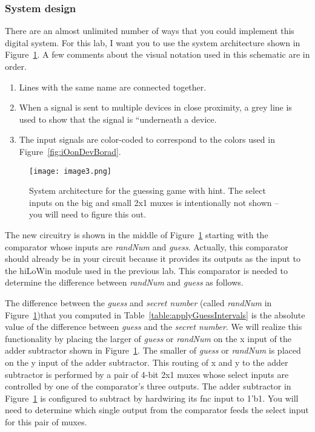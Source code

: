\subsubsection{System design}

There are an almost unlimited number of ways that you could implement
this digital system. For this lab, I want you to use the system
architecture shown in Figure~\ref{fig:guessWithHintSystemArch}. A few comments about the visual notation
used in this schematic are in order.

\begin{enumerate}
\def\labelenumi{\arabic{enumi})}
\item
  Lines with the same name are connected together.
\item
  When a signal is sent to multiple devices in close proximity, a grey
  line is used to show that the signal is ``underneath a device.
\item
  The input signals are color-coded to correspond to the colors used in
  Figure~\ref{fig:iOonDevBorad}.
\end{enumerate}

\begin{figure}
\texttt{[image:  image3.png]}
\caption{System architecture for the guessing game with hint. The select
inputs on the big and small 2x1 muxes is intentionally not shown -- you
will need to figure this out.}
\label{fig:guessWithHintSystemArch}
\end{figure}

The new circuitry is shown in the middle of Figure~\ref{fig:guessWithHintSystemArch} starting with the
comparator whose inputs are \emph{randNum} and \emph{guess}. Actually,
this comparator should already be in your circuit because it provides
its outputs as the input to the hiLoWin module used in the previous lab.
This comparator is needed to determine the difference between
\emph{randNum} and \emph{guess} as follows.

The difference between the \emph{guess} and \emph{secret number} (called
\emph{randNum} in Figure~\ref{fig:guessWithHintSystemArch})that you computed 
in Table~\ref{table:applyGuessIntervals} is 
the absolute
value of the difference between \emph{guess} and the \emph{secret
number}. We will realize this functionality by placing the larger of
\emph{guess} or \emph{randNum} on the x input of the adder subtractor
shown in Figure~\ref{fig:guessWithHintSystemArch}. The smaller of \emph{guess} or \emph{randNum} is
placed on the y input of the adder subtractor. This routing of x and y
to the adder subtractor is performed by a pair of 4-bit 2x1 muxes whose
select inputs are controlled by one of the comparator's three outputs.
The adder subtractor in Figure~\ref{fig:guessWithHintSystemArch} is configured to subtract by hardwiring
its fnc input to 1'b1. You will need to determine which single output
from the comparator feeds the select input for this pair of muxes.

